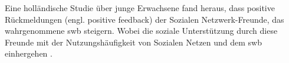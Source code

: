 Eine holländische Studie über junge Erwachsene fand heraus, dass positive Rückmeldungen (engl. positive feedback) der Sozialen Netzwerk-Freunde, das wahrgenommene \gls{swb} steigern. Wobei die soziale Unterstützung durch diese Freunde mit der Nutzungshäufigkeit von Sozialen Netzen und dem \gls{swb} einhergehen \cite{Valkenburg:2006}. 

